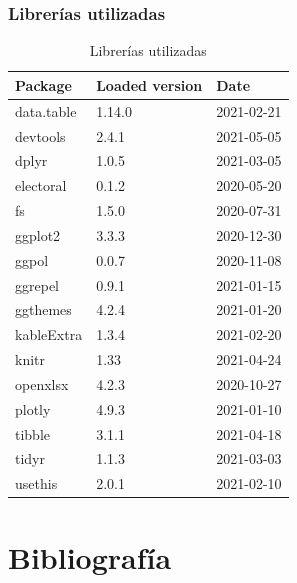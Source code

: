 \documentclass[12pt,a4paper,]{book}
\def\ifdoblecara{} %
\def\ifcitapandoc{} %
\let\ifcitapandoc\undefined %
\numberwithin{dummy}{section}
\theoremstyle{ocrenumbox}
\theoremstyle{blacknumex}
\theoremstyle{blacknumbox}
\theoremstyle{ocrenum}
\theoremstyle{ocrenum}
\begin{document}
\hypertarget{libreruxedas-utilizadas}{%
\subsection{Librerías utilizadas}\label{libreruxedas-utilizadas}}

\renewcommand{\arraystretch}{0.6}

\begin{table}[!h]

\caption[ ]{\label{tab:Reproducibility-SessionInfo-R-packages}Librerías utilizadas}
\centering
\begin{tabular}[t]{lll}
\toprule
Package & Loaded version & Date\\
\midrule
data.table & 1.14.0 & 2021-02-21\\
devtools & 2.4.1 & 2021-05-05\\
dplyr & 1.0.5 & 2021-03-05\\
electoral & 0.1.2 & 2020-05-20\\
fs & 1.5.0 & 2020-07-31\\
\addlinespace
ggplot2 & 3.3.3 & 2020-12-30\\
ggpol & 0.0.7 & 2020-11-08\\
ggrepel & 0.9.1 & 2021-01-15\\
ggthemes & 4.2.4 & 2021-01-20\\
kableExtra & 1.3.4 & 2021-02-20\\
\addlinespace
knitr & 1.33 & 2021-04-24\\
openxlsx & 4.2.3 & 2020-10-27\\
plotly & 4.9.3 & 2021-01-10\\
tibble & 3.1.1 & 2021-04-18\\
tidyr & 1.1.3 & 2021-03-03\\
\addlinespace
usethis & 2.0.1 & 2021-02-10\\
\bottomrule
\end{tabular}
\end{table}
\renewcommand{\arraystretch}{1}

\FloatBarrier
\cleardoublepage

\ifdefined\ifdoblecara
  \fancyhead[LE,RO]{}
  \fancyfoot[LO,RE]{}
\else
  \fancyhead[RO]{}
  \fancyfoot[LO]{}
\fi

\ifdefined\ifcitapandoc

\hypertarget{bibliografuxeda}{%
\chapter*{Bibliografía}\label{bibliografuxeda}}

\else

\nocite{*}

\fi




\end{document}
